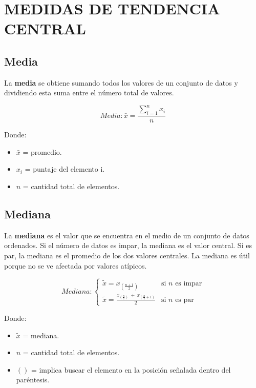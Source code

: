 \documentclass[
  letterpaper,
  DIV=11,
  numbers=noendperiod]{scrreprt}
\providecommand{\tightlist}{%
  \setlength{\itemsep}{0pt}\setlength{\parskip}{0pt}}
\begin{document}
\section{MEDIDAS DE TENDENCIA
CENTRAL}\label{medidas-de-tendencia-central}

\subsection{Media}\label{media}

La \textbf{media} se obtiene sumando todos los valores de un conjunto de
datos y dividiendo esta suma entre el número total de valores.

\[
Media: \bar{x} = \frac{\sum_{i=1}^{n} x_i}{n}
\]

Donde:

\begin{itemize}
\item
  \(\bar{x}\) = promedio.
\item
  \(x_i\) = puntaje del elemento i.
\item
  \(n\) = cantidad total de elementos.
\end{itemize}

\subsection{Mediana}\label{mediana}

La \textbf{mediana} es el valor que se encuentra en el medio de un
conjunto de datos ordenados. Si el número de datos es impar, la mediana
es el valor central. Si es par, la mediana es el promedio de los dos
valores centrales. La mediana es útil porque no se ve afectada por
valores atípicos.

\[
Mediana:\begin{cases} 
\tilde{x} = x_{(\frac{n+1}{2})} & \text{si } n \text{ es impar} \\ 
\tilde{x} = \frac{x_{(\frac{n}{2})} \ + \ x_{(\frac{n}{2} + 1)}}{2} & \text{si } n \text{ es par} 
\end{cases}
\]

Donde:

\begin{itemize}
\tightlist
\item
  \(\tilde{x}\) = mediana.
\item
  \(n\) = cantidad total de elementos.
\item
  \(()\) = implica buscar el elemento en la posición señalada dentro del
  paréntesis.
\end{itemize}
\end{document}
